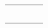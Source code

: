 \documentclass{article}
\begin{document}
\begin{tabular}{ |p{4cm}|p{5.5cm}|p{6cm}|p{3.5cm}|  }
\hline
                                                                             &  %
                                                                             &  %
                                                                             &  %
                                                                             \\ %
\hline
                                                                             &  %
                                                                             &  %
                                                                             &  %
                                                                             \\ %
\hline
                                                                             &  %
                                                                             &  %
                                                                             &  %
                                                                             \\ %
\hline
                                                                             &  %
                                                                             &  %
                                                                             &  %
                                                                             \\ %
\hline
                                                                             &  %
                                                                             &  %
                                                                             &  %
                                                                             \\ %
\hline
                                                                             &  %
                                                                             &  %
                                                                             &  %
                                                                             \\ %
\hline
\end{tabular}

\newpage
\end{document}
